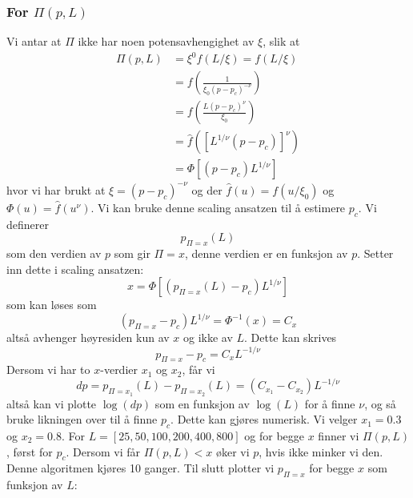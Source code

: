 \documentclass[english, a4paper]{article}
\begin{document}
\subsubsection{For $\Pi(p,L)$}
Vi antar at $\Pi$ ikke har noen potensavhengighet av $\xi$, slik at
\begin{align}
 \Pi(p,L) &= \xi^0f(L/\xi) = f(L/\xi) \\
          &= f\left(\frac{1}{\xi_0(p-p_c)^{-\nu}}\right) \\
          &= f(\frac{L(p-p_c)^\nu}{\xi_0}) \\
          &= \hat{f}([L^{1/\nu}(p-p_c)]^\nu) \\
          &= \Phi[(p-p_c)L^{1/\nu}]
\end{align}
hvor vi har brukt at $\xi = (p-p_c)^{-\nu}$ og der $\hat{f}(u) = f(u/\xi_0)$ og
$\Phi(u) = \hat{f}(u^\nu)$. Vi kan bruke denne scaling ansatzen til å 
estimere $p_c$. Vi definerer
\begin{equation}
 p_{\Pi = x}(L)
\end{equation}
som den verdien av $p$ som gir $\Pi = x$, denne verdien er en funksjon av $p$. 
Setter inn dette i scaling ansatzen:
\begin{equation}
 x = \Phi[(p_{\Pi=x}(L) - p_c)L^{1/\nu}]
\end{equation}
som kan løses som 
\begin{equation}
 (p_{\Pi=x} - p_c)L^{1/\nu} = \Phi^{-1}(x) = C_x
\end{equation}
altså avhenger høyresiden kun av $x$ og ikke av $L$. Dette kan skrives
\begin{equation}
 p_{\Pi=x} - p_c = C_xL^{-1/\nu}
\end{equation}
Dersom vi har to $x$-verdier $x_1$ og $x_2$, får vi
\begin{equation}
 dp = p_{\Pi=x_1}(L) - p_{\Pi=x_2}(L) = (C_{x_1} - C_{x_2})L^{-1/\nu}
\end{equation}
altså kan vi plotte $\log(dp)$ som en funksjon av $\log(L)$ for å finne $\nu$, og så 
bruke likningen over til å finne $p_c$. Dette kan gjøres numerisk. Vi velger $x_1=0.3$ og $x_2=0.8$. 
For $L=[25,50,100,200,400,800]$ og for begge $x$ finner vi $\Pi(p,L)$, først for $p_c$. Dersom
vi får $\Pi(p,L) < x$ øker vi $p$, hvis ikke minker vi den. Denne algoritmen kjøres 10 ganger. Til 
slutt plotter vi $p_{\Pi = x}$ for begge $x$ som funksjon av $L$:
\end{document}

